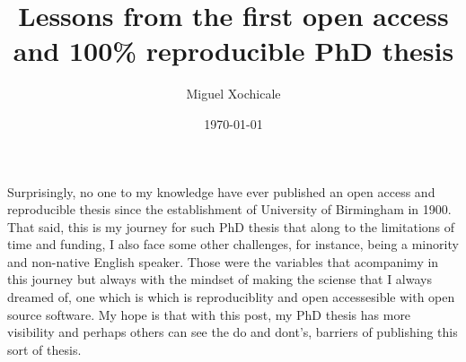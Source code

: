 \documentclass[11pt]{article}
\title{
Lessons from the first open access and 100\% reproducible 
PhD thesis}
\author{Miguel Xochicale}
\date{\today}
\begin{document}
\maketitle

Surprisingly, %
no one to my knowledge have ever published an open access and reproducible thesis 
since the establishment of University of Birmingham in 1900. 
That said, this is my journey for such PhD thesis
that along to the limitations of time and funding, 
I also face some other challenges, for instance, %
being a minority and non-native English speaker.  
Those were the variables that acompanimy in this journey 
but always with the mindset of making the sciense that 
I always dreamed of, one which is 
which is reproduciblity and open accessesible with 
open source software.
My hope is that with this post, my PhD thesis has more 
visibility and perhaps others can see the do and dont's,
barriers of publishing this sort of thesis.



\end{document}
